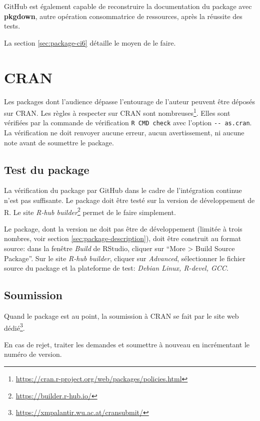 \documentclass[
  12pt,
  french,
  a4paper,
  extrafontsizes,onecolumn,openright
  ]{memoir}
\begin{document}
GitHub est également capable de reconstruire la documentation du package avec \textbf{pkgdown}, autre opération consommatrice de ressources, après la réussite des tests.

La section \ref{sec:package-ci6} détaille le moyen de le faire.

\hypertarget{sec:package-cran}{%
\section{CRAN}\label{sec:package-cran}}

Les packages dont l'audience dépasse l'entourage de l'auteur peuvent être déposés sur CRAN.
Les règles à respecter sur CRAN sont nombreuses\footnote{\url{https://cran.r-project.org/web/packages/policies.html}}. Elles sont vérifiées par la commande de vérification \texttt{R\ CMD\ check} avec l'option \texttt{-\/-\ as.cran}.
La vérification ne doit renvoyer aucune erreur, aucun avertissement, ni aucune note avant de soumettre le package.

\hypertarget{test-du-package}{%
\subsection{Test du package}\label{test-du-package}}

La vérification du package par GitHub dans le cadre de l'intégration continue n'est pas suffisante.
Le package doit être testé sur la version de développement de R.
Le site \emph{R-hub builder}\footnote{\url{https://builder.r-hub.io/}} permet de le faire simplement.

Le package, dont la version ne doit pas être de développement (limitée à trois nombres, voir section \ref{sec:package-description}), doit être construit au format source: dans la fenêtre \emph{Build} de RStudio, cliquer sur \enquote{More \textgreater{} Build Source Package}.
Sur le site \emph{R-hub builder}, cliquer sur \emph{Advanced}, sélectionner le fichier source du package et la plateforme de test: \emph{Debian Linux, R-devel, GCC}.

\hypertarget{soumission}{%
\subsection{Soumission}\label{soumission}}

Quand le package est au point, la soumission à CRAN se fait par le site web dédié\footnote{\url{https://xmpalantir.wu.ac.at/cransubmit/}}.

En cas de rejet, traiter les demandes et soumettre à nouveau en incrémentant le numéro de version.
\end{document}

